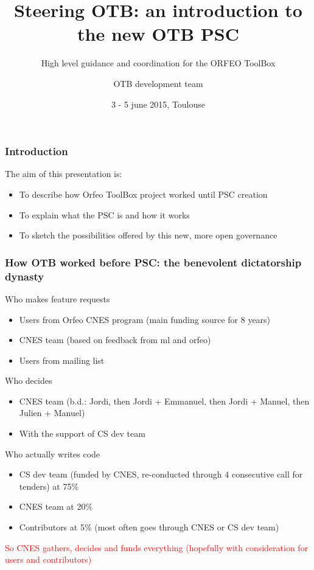 \documentclass[8pt]{beamer}
\title{Steering OTB: an introduction to the new OTB PSC}
\subtitle{High level guidance and coordination for the ORFEO ToolBox}
\author{OTB development team}%
\date{3 - 5 june 2015, Toulouse}
\begin{document}
\begin{frame}
\titlepage
\end{frame}

\begin{frame}
\frametitle{Introduction}
The aim of this presentation is:
\begin{itemize}
\item To describe how Orfeo ToolBox project worked until PSC creation
\item To explain what the PSC is and how it works
\item To sketch the possibilities offered by this new, more open governance
\end{itemize}

\end{frame}

\begin{frame}
\frametitle{How OTB worked before PSC: the benevolent dictatorship dynasty}
\begin{block}{Who makes feature requests}
\begin{itemize}
\item Users from Orfeo CNES program (main funding source for 8 years)
\item CNES team (based on feedback from ml and orfeo)
\item Users from mailing list
\end{itemize}
\end{block}

\begin{block}{Who decides}
\begin{itemize}
\item CNES team (b.d.: Jordi, then Jordi + Emmanuel, then Jordi + Manuel, then Julien + Manuel)
\item With the support of CS dev team
\end{itemize}
\end{block}

\begin{block}{Who actually writes code}
\begin{itemize}
\item CS dev team (funded by CNES, re-conducted through 4 consecutive call for tenders) at 75\%
\item CNES team at 20\%
\item Contributors at 5\% (most often goes through CNES or CS dev team)
\end{itemize}
\end{block}

\textcolor{red}{So CNES gathers, decides and funds everything (hopefully with consideration for users and contributors)}

\end{frame}
\end{document}
